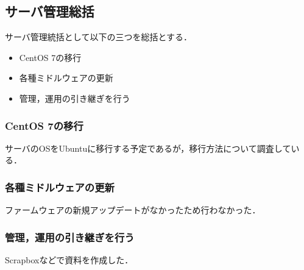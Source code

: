 \subsection*{サーバ管理総括}


サーバ管理統括として以下の三つを総括とする．
\begin{itemize}
    \item CentOS 7の移行
    \item 各種ミドルウェアの更新
    \item 管理，運用の引き継ぎを行う
\end{itemize}

\subsubsection*{CentOS 7の移行}
サーバのOSをUbuntuに移行する予定であるが，移行方法について調査している．

\subsubsection*{各種ミドルウェアの更新}
ファームウェアの新規アップデートがなかったため行わなかった．

\subsubsection*{管理，運用の引き継ぎを行う}
Scrapboxなどで資料を作成した．

